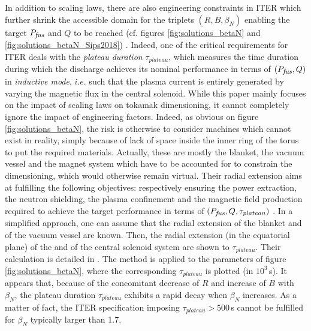 \documentclass[12pt]{iopart}
\newcommand{\Pfus}{{P_{\textrm{\it\footnotesize fus}}}}
\newcommand{\newstuff}[1]{\color{blue}{#1}\color{black}}
\begin{document}
In addition to scaling laws, there are also engineering constraints in ITER which further shrink the accessible domain for the triplets $(R, B, \beta_N)$ enabling the target $\Pfus$ and $Q$ to be reached (cf. figures \ref{fig:solutions_betaN} and \ref{fig:solutions_betaN_Sips2018}) \cite{Reux2018,Federici2017}. Indeed, one of the critical requirements for ITER deals with the \emph{plateau duration} $\tau_{plateau}$, which measures the time duration during which the discharge achieves its nominal performance in terms of $(\Pfus, Q)$ in \emph{inductive mode}, $i.e.$ such that the plasma current is entirely generated by varying the magnetic flux in the central solenoid.
While this paper mainly focuses on the impact of scaling laws on tokamak dimensioning, it cannot completely ignore the impact of engineering factors. Indeed, as obvious on figure \ref{fig:solutions_betaN}, the risk is otherwise to consider machines which cannot exist in reality, simply because of lack of space inside the inner ring of the torus to put the required materials. 
Actually, these are mostly the blanket, the vacuum vessel and the magnet system which have to be accounted for to constrain the dimensioning, which would otherwise remain virtual. Their radial extension aims at fulfilling the following objectives: respectively ensuring the power extraction, the neutron shielding, the plasma confinement and the magnetic field production required to achieve the target performance in terms of $(\Pfus, Q, \tau_{plateau})$ \cite{Duchateau2014, Federici2017, Reux2018}.  
In a simplified approach, one can assume that the radial extension of the blanket and of the vacuum vessel are known. Then, the radial extension (in the equatorial plane) of the \newstuff{inner legs of the toroidal field coils } and of the central solenoid system are shown to \newstuff{constrain the achievable } $\tau_{plateau}$. Their calculation is detailed in \cite{Duchateau2014}.
The method is applied to the parameters of figure \ref{fig:solutions_betaN}, where the corresponding $\tau_{plateau}$ is plotted (in $10^3\,$s). It appears that, because of the concomitant decrease of $R$ and increase of $B$ with $\beta_N$, the plateau duration $\tau_{plateau}$ exhibits a rapid decay when $\beta_N$ increases. As a matter of fact, the ITER specification imposing $\tau_{plateau} >500\,$s cannot be fulfilled for $\beta_N$ typically larger than 1.7.

\end{document}
